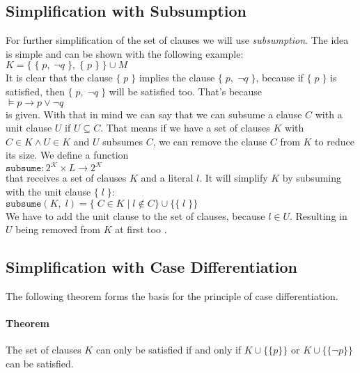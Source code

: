 \subsection{Simplification with Subsumption}
\label{sub:sciDavisPutnamSubsumption}
For further simplification of the set of clauses we will use \emph{subsumption}. The idea is simple and can be shown with the following example:
\\[0.2cm]
\hspace*{1.3cm} $K = \{\; \{\; p,\; \neg q \;\},\; \{\; p\; \}\; \} \cup M$
\\[0.2cm]
It is clear that the clause $\{\; p\; \}$ implies the clause $\{\; p,\; \neg q \;\}$, because if $\{\; p\; \}$ is satisfied, then $\{\; p,\; \neg q \;\}$ will be satisfied too. That's because
\\[0.2cm]
\hspace*{1.3cm} $\models p \to p \lor \neg q$
\\[0.2cm]
is given. With that in mind we can say that we can subsume a clause $C$ with a unit clause $U$ if $U \subseteq C$. That means if we have a set of clauses $K$ with $C \in K \land U \in K$ and $U$ subsumes $C$, we can remove the clause $C$ from $K$ to reduce its size. We define a function
\\[0.2cm]
\hspace*{1.3cm} $\texttt{subsume}: 2^{\mathcal{K}} \times L \to 2^{\mathcal{K}}$
\\[0.2cm]
that receives a set of clauses $K$ and a literal $l$. It will simplify $K$ by subsuming with the unit clause $\{\; l\; \}$:
\\[0.2cm]
\hspace*{1.3cm} $\texttt{subsume}(K,\; l) = \{\; C \in K\; |\; l \notin C\} \cup \{\{\; l\; \}\}$
\\[0.2cm]
We have to add the unit clause to the set of clauses, because $l \in U$. Resulting in $U$ being removed from $K$ at first too \cite{Stroetman2019}. 

\subsection{Simplification with Case Differentiation}
\label{sub:sciDavisPutnamCaseDiv}
The following theorem forms the basis for the principle of case differentiation.

\paragraph{Theorem}
The set of clauses $K$ can only be satisfied if and only if $K \cup \bigl\{\{p\}\bigr\}$ or $K \cup \bigl\{\{\neg p\}\bigr\}$ can be satisfied.

